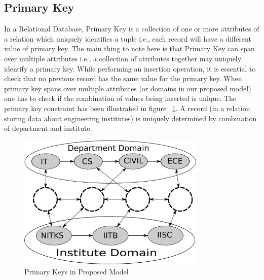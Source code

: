 \documentclass[12pt, oneside]{book}
\begin{document}
\subsection{Primary Key}
In a Relational Database, Primary Key is a collection of one or more attributes of a relation which uniquely identifies a tuple i.e., each record will have a different value of primary key. The main thing to note here is that Primary Key can span over multiple attributes i.e., a collection of attributes together may uniquely identify a primary key. While performing an insertion operation, it is essential to check that no previous record has the same value for the primary key. When primary key spans over multiple attributes (or domains in our proposed model) one has to check if the combination of values being inserted is unique. The primary key constraint has been illustrated in figure ~\ref{fig:primary_key}. A record (in a relation storing data about engineering institutes) is uniquely determined by combination of department and institute.
\begin{figure}
 \centering
 \includegraphics[width=0.8\textwidth]{pics/primary_key.pdf}
 \caption{Primary Keys in Proposed Model}
 \label{fig:primary_key}
\end{figure}
\end{document}
